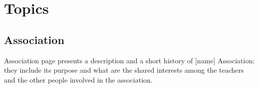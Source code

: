 \documentclass[../../DD.tex]{subfiles}
\begin{document}
\section{Topics \label{sect:2.1}}
	\subsection{Association}
		Association page presents a description and a short history of [name] Association; they include its purpose and what are the shared interests among the teachers and the other people involved in the association.

	
\end{document}
